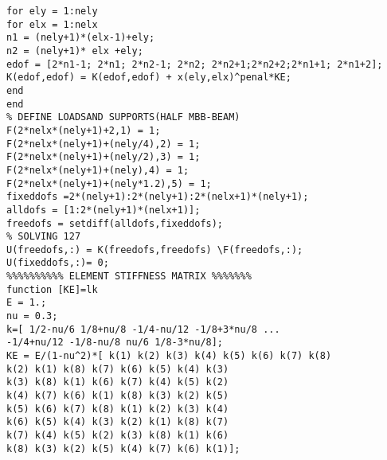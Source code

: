 \documentclass{article}
\begin{document}
\begin{verbatim}
for ely = 1:nely
for elx = 1:nelx
n1 = (nely+1)*(elx-1)+ely;
n2 = (nely+1)* elx +ely;
edof = [2*n1-1; 2*n1; 2*n2-1; 2*n2; 2*n2+1;2*n2+2;2*n1+1; 2*n1+2];
K(edof,edof) = K(edof,edof) + x(ely,elx)^penal*KE;
end
end
% DEFINE LOADSAND SUPPORTS(HALF MBB-BEAM)
F(2*nelx*(nely+1)+2,1) = 1;
F(2*nelx*(nely+1)+(nely/4),2) = 1;
F(2*nelx*(nely+1)+(nely/2),3) = 1;
F(2*nelx*(nely+1)+(nely),4) = 1;
F(2*nelx*(nely+1)+(nely*1.2),5) = 1;
fixeddofs =2*(nely+1):2*(nely+1):2*(nelx+1)*(nely+1);
alldofs = [1:2*(nely+1)*(nelx+1)];
freedofs = setdiff(alldofs,fixeddofs);
% SOLVING 127
U(freedofs,:) = K(freedofs,freedofs) \F(freedofs,:);
U(fixeddofs,:)= 0;
%%%%%%%%%% ELEMENT STIFFNESS MATRIX %%%%%%%
function [KE]=lk
E = 1.;
nu = 0.3;
k=[ 1/2-nu/6 1/8+nu/8 -1/4-nu/12 -1/8+3*nu/8 ...
-1/4+nu/12 -1/8-nu/8 nu/6 1/8-3*nu/8];
KE = E/(1-nu^2)*[ k(1) k(2) k(3) k(4) k(5) k(6) k(7) k(8)
k(2) k(1) k(8) k(7) k(6) k(5) k(4) k(3)
k(3) k(8) k(1) k(6) k(7) k(4) k(5) k(2)
k(4) k(7) k(6) k(1) k(8) k(3) k(2) k(5)
k(5) k(6) k(7) k(8) k(1) k(2) k(3) k(4)
k(6) k(5) k(4) k(3) k(2) k(1) k(8) k(7)
k(7) k(4) k(5) k(2) k(3) k(8) k(1) k(6)
k(8) k(3) k(2) k(5) k(4) k(7) k(6) k(1)];


\end{verbatim}
\end{document}
